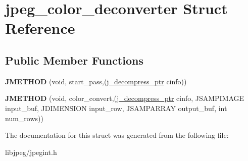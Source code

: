 \hypertarget{structjpeg__color__deconverter}{\section{jpeg\-\_\-color\-\_\-deconverter Struct Reference}
\label{structjpeg__color__deconverter}
}
\subsection*{Public Member Functions}
\begin{DoxyCompactItemize}
\item 
\hypertarget{structjpeg__color__deconverter_a90ddfc502a2aadc44f157007a3e49056}{{\bfseries J\-M\-E\-T\-H\-O\-D} (void, start\-\_\-pass,(\hyperlink{structjpeg__decompress__struct}{j\-\_\-decompress\-\_\-ptr} cinfo))}\label{structjpeg__color__deconverter_a90ddfc502a2aadc44f157007a3e49056}

\item 
\hypertarget{structjpeg__color__deconverter_ab0fedad382d6b40b3698181271bb4ba4}{{\bfseries J\-M\-E\-T\-H\-O\-D} (void, color\-\_\-convert,(\hyperlink{structjpeg__decompress__struct}{j\-\_\-decompress\-\_\-ptr} cinfo, J\-S\-A\-M\-P\-I\-M\-A\-G\-E input\-\_\-buf, J\-D\-I\-M\-E\-N\-S\-I\-O\-N input\-\_\-row, J\-S\-A\-M\-P\-A\-R\-R\-A\-Y output\-\_\-buf, int num\-\_\-rows))}\label{structjpeg__color__deconverter_ab0fedad382d6b40b3698181271bb4ba4}

\end{DoxyCompactItemize}


The documentation for this struct was generated from the following file\-:\begin{DoxyCompactItemize}
\item 
libjpeg/jpegint.\-h\end{DoxyCompactItemize}
